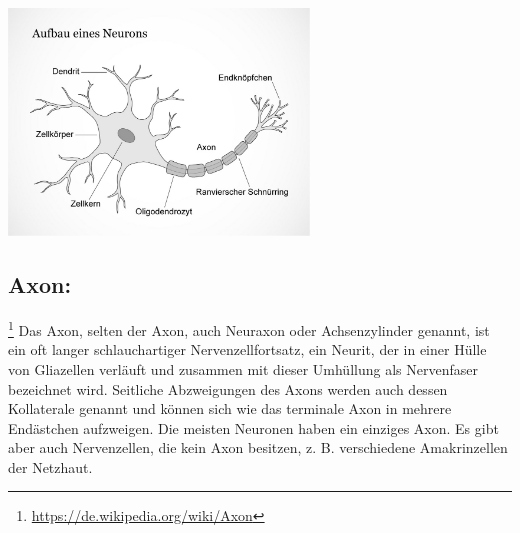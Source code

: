 \includegraphics[width=0.6\textwidth]{lectures/terms/pix/neuron.jpg}

\subsection{Axon:}\footnote{\url{https://de.wikipedia.org/wiki/Axon}} Das Axon, selten der Axon, auch Neuraxon oder Achsenzylinder genannt, ist ein oft langer schlauchartiger Nervenzellfortsatz, ein Neurit, der in einer Hülle von Gliazellen verläuft und zusammen mit dieser Umhüllung als Nervenfaser bezeichnet wird. Seitliche Abzweigungen des Axons werden auch dessen Kollaterale genannt und können sich wie das terminale Axon in mehrere Endästchen aufzweigen. Die meisten Neuronen haben ein einziges Axon. Es gibt aber auch Nervenzellen, die kein Axon besitzen, z. B. verschiedene Amakrinzellen der Netzhaut.


